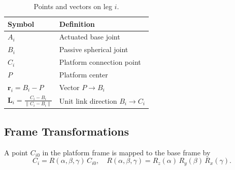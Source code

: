 \documentclass[letterpaper, 10 pt, conference]{ieeeconf}  %
\begin{document}
\begin{table}[h]
  \centering
  \caption{Points and vectors on leg \(i\).}
  \label{tab:geo}
  \begin{tabular}{@{}ll@{}}
    \toprule
    Symbol & Definition \\
    \midrule
    \(A_i\) & Actuated base joint \\
    \(B_i\) & Passive spherical joint \\
    \(C_i\) & Platform connection point \\
    \(P\)   & Platform center \\
    \(\mathbf r_i = B_i - P\) 
           & Vector \(P\to B_i\) \\
    \(\mathbf L_i = \tfrac{C_i - B_i}{\|C_i - B_i\|}\) 
           & Unit link direction \(B_i\to C_i\) \\
    \bottomrule
  \end{tabular}
\end{table}



\subsection{Frame Transformations}
\label{sec:frames}
A point \(C_{i0}\) in the platform frame is mapped to the base frame by
\[
  C_i = R(\alpha,\beta,\gamma)\,C_{i0}, 
  \quad
  R(\alpha,\beta,\gamma) = R_z(\alpha)\,R_y(\beta)\,R_x(\gamma).
\]
\end{document}
